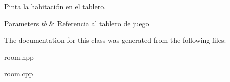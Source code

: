 Pinta la habitación en el tablero. 


\begin{DoxyParams}{Parameters}
{\em tb} & Referencia al tablero de juego \\
\hline
\end{DoxyParams}


The documentation for this class was generated from the following files\-:\begin{DoxyCompactItemize}
\item 
room.\-hpp\item 
room.\-cpp\end{DoxyCompactItemize}

